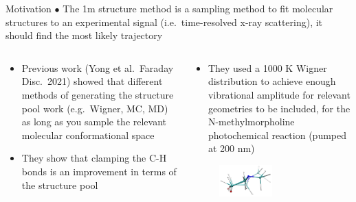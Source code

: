 \documentclass{beamer}
\begin{document}
\begin{frame}{Motivation}
$\bullet$ The 1m structure method is a sampling method to fit molecular structures to an experimental signal (i.e.\ time-resolved x-ray scattering), it should find the most likely trajectory
	\begin{columns} 
		\begin{column}{.5\textwidth}
			\begin{itemize}
				\item Previous work (Yong et al.\ Faraday Disc.\ 2021) showed that different methods of generating the structure pool work (e.g.\ Wigner, MC, MD) as long as you sample the relevant molecular conformational space 
				\item They show that clamping the C-H bonds is an improvement in terms of the structure pool			
			\end{itemize}
		\end{column}
		\begin{column}{.5\textwidth}
			\begin{itemize}
				\item They used a 1000 K Wigner distribution to achieve enough vibrational amplitude for relevant geometries to be included, for the N-methylmorpholine photochemical reaction (pumped at 200 nm)
			\end{itemize}
		\begin{figure}
			\centering
			\includegraphics[width=0.5\textwidth]{allmodes_1m_2m_frame10_comparison.png}
		\end{figure}
		\end{column}%
	\end{columns}
\end{frame}
\end{document}
